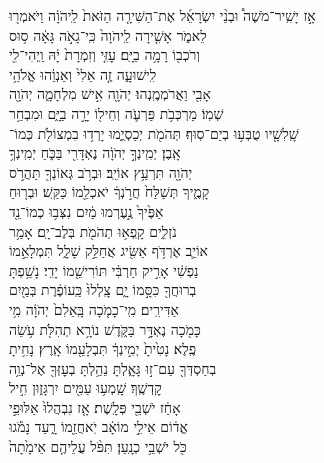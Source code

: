 \documentclass[twoside, openany, parskip=half, 11pt]{book}
\begin{document}
 אָ֣ז \hfill
יָשִֽׁיר־מֹשֶׁה֩ \hfill וּבְנֵ֨י \hfill יִשְׂרָאֵ֜ל \hfill אֶת־הַשִּׁירָ֤ה \hfill הַזֹּאת֙ \hfill לַֽיהֹוָ֔ה \hfill וַיֹּאמְר֖וּ \\
לֵאמֹ֑ר \hfill אָשִׁ֤ירָה לַֽיהֹוָה֙ כִּֽי־גָאֹ֣ה גָּאָ֔ה \hfill ס֥וּס \\
וְרֹכְב֖וֹ רָמָ֥ה בַיָּֽם׃ \hfill  עׇזִּ֤י וְזִמְרָת֙ יָ֔הּ וַֽיְהִי־לִ֖י \\
לִֽישׁוּעָ֑ה \hfill זֶ֤ה אֵלִי֙ וְאַנְוֵ֔הוּ \hfill אֱלֹהֵ֥י \\
אָבִ֖י וַאֲרֹמְמֶֽנְהוּ׃ \hfill יְהֹוָ֖ה אִ֣ישׁ מִלְחָמָ֑ה יְהֹוָ֖ה \\
שְׁמֽוֹ׃ \hfill מַרְכְּבֹ֥ת פַּרְעֹ֛ה וְחֵיל֖וֹ יָרָ֣ה בַיָּ֑ם \hfill וּמִבְחַ֥ר\\
שָֽׁלִשָׁ֖יו טֻבְּע֥וּ בְיַם־סֽוּף׃ \hfill תְּהֹמֹ֖ת יְכַסְיֻ֑מוּ יָרְד֥וּ בִמְצוֹלֹ֖ת כְּמוֹ־\\
אָֽבֶן׃ \hfill יְמִֽינְךָ֣ יְהֹוָ֔ה נֶאְדָּרִ֖י בַּכֹּ֑חַ \hfill יְמִֽינְךָ֥ \\
יְהֹוָ֖ה תִּרְעַ֥ץ אוֹיֵֽב׃  \hfill וּבְרֹ֥ב גְּאוֹנְךָ֖ תַּהֲרֹ֣ס \\
קָמֶ֑יךָ \hfill תְּשַׁלַּח֙ חֲרֹ֣נְךָ֔ יֹאכְלֵ֖מוֹ כַּקַּֽשׁ׃ \hfill וּבְר֤וּחַ \\
אַפֶּ֙יךָ֙ נֶ֣עֶרְמוּ מַ֔יִם \hfill נִצְּב֥וּ כְמוֹ־נֵ֖ד \\
נֹזְלִ֑ים \hfill קָֽפְא֥וּ תְהֹמֹ֖ת בְּלֶב־יָֽם׃ \hfill אָמַ֥ר \\
אוֹיֵ֛ב אֶרְדֹּ֥ף אַשִּׂ֖יג \hfill אֲחַלֵּ֣ק שָׁלָ֑ל תִּמְלָאֵ֣מוֹ \\
נַפְשִׁ֔י \hfill אָרִ֣יק חַרְבִּ֔י תּוֹרִישֵׁ֖מוֹ יָדִֽי׃ \hfill נָשַׁ֥פְתָּ \\
בְרוּחֲךָ֖ כִּסָּ֣מוֹ יָ֑ם \hfill צָֽלְלוּ֙ כַּֽעוֹפֶ֔רֶת בְּמַ֖יִם \\
אַדִּירִֽים׃ \hfill מִֽי־כָמֹ֤כָה בָּֽאֵלִם֙ יְהֹוָ֔ה \hfill מִ֥י \\
כָּמֹ֖כָה נֶאְדָּ֣ר בַּקֹּ֑דֶשׁ \hfill נוֹרָ֥א תְהִלֹּ֖ת עֹ֥שֵׂה \\
פֶֽלֶא׃ \hfill נָטִ֙יתָ֙ יְמִ֣ינְךָ֔ תִּבְלָעֵ֖מוֹ אָֽרֶץ׃ \hfill  נָחִ֥יתָ \\
בְחַסְדְּךָ֖ עַם־ז֣וּ גָּאָ֑לְתָּ \hfill נֵהַ֥לְתָּ בְעׇזְּךָ֖ אֶל־נְוֵ֥ה \\
קׇדְשֶֽׁךָ׃ \hfill שָֽׁמְע֥וּ עַמִּ֖ים יִרְגָּז֑וּן \hfill חִ֣יל \\
אָחַ֔ז יֹשְׁבֵ֖י פְּלָֽשֶׁת׃ \hfill אָ֤ז נִבְהֲלוּ֙ אַלּוּפֵ֣י \\
אֱד֔וֹם \hfill אֵילֵ֣י מוֹאָ֔ב יֹֽאחֲזֵ֖מוֹ רָ֑עַד \hfill נָמֹ֕גוּ \\
כֹּ֖ל יֹשְׁבֵ֥י כְנָֽעַן׃ \hfill תִּפֹּ֨ל עֲלֵיהֶ֤ם אֵימָ֙תָה֙ \\
\end{document}
